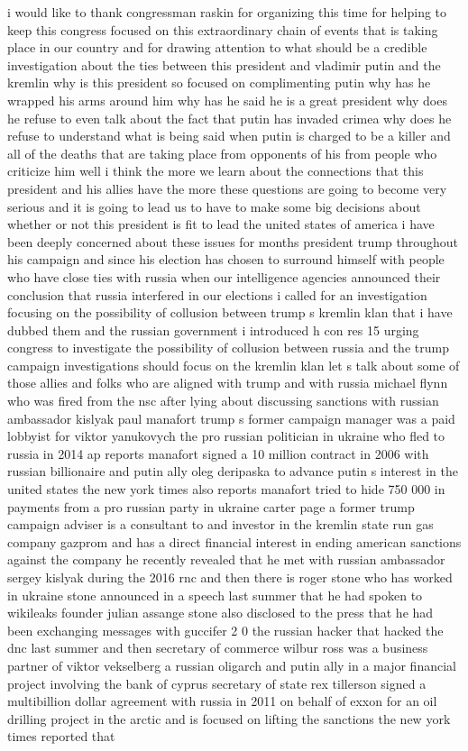 \documentclass{article}
\begin{document}
\vspace{8mm}
i would like to thank congressman raskin for organizing this time for helping to keep this congress focused on this extraordinary chain of events that is taking place in our country and for drawing attention to what should be a credible investigation about the ties between this president and vladimir putin and the kremlin why is this president so focused on complimenting putin why has he wrapped his arms around him why has he said he is a great president why does he refuse to even talk about the fact that putin has invaded crimea why does he refuse to understand what is being said when putin is charged to be a killer and all of the deaths that are taking place from opponents of his from people who criticize him well i think the more we learn about the connections that this president and his allies have the more these questions are going to become very serious and it is going to lead us to have to make some big decisions about whether or not this president is fit to lead the united states of america i have been deeply concerned about these issues for months president trump throughout his campaign and since his election has chosen to surround himself with people who have close ties with russia when our intelligence agencies announced their conclusion that russia interfered in our elections i called for an investigation focusing on the possibility of collusion between trump s kremlin klan that i have dubbed them and the russian government i introduced h con res 15 urging congress to investigate the possibility of collusion between russia and the trump campaign investigations should focus on the kremlin klan let s talk about some of those allies and folks who are aligned with trump and with russia michael flynn who was fired from the nsc after lying about discussing sanctions with russian ambassador kislyak paul manafort trump s former campaign manager was a paid lobbyist for viktor yanukovych the pro russian politician in ukraine who fled to russia in 2014 ap reports manafort signed a 10 million contract in 2006 with russian billionaire and putin ally oleg deripaska to advance putin s interest in the united states the new york times also reports manafort tried to hide 750 000 in payments from a pro russian party in ukraine carter page a former trump campaign adviser is a consultant to and investor in the kremlin state run gas company gazprom and has a direct financial interest in ending american sanctions against the company he recently revealed that he met with russian ambassador sergey kislyak during the 2016 rnc and then there is roger stone who has worked in ukraine stone announced in a speech last summer that he had spoken to wikileaks founder julian assange stone also disclosed to the press that he had been exchanging messages with guccifer 2 0 the russian hacker that hacked the dnc last summer and then secretary of commerce wilbur ross was a business partner of viktor vekselberg a russian oligarch and putin ally in a major financial project involving the bank of cyprus secretary of state rex tillerson signed a multibillion dollar agreement with russia in 2011 on behalf of exxon for an oil drilling project in the arctic and is focused on lifting the sanctions the new york times reported that 
\end{document}
